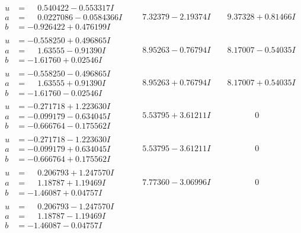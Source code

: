 \documentclass[1p]{elsarticle_modified}
\theoremstyle{definition}
\begin{document}
$$\begin{array}{c|c|c}
\begin{aligned}
u &= \phantom{-}0.540422 - 0.553317 I \\
a &= \phantom{-}0.0227086 - 0.0584366 I \\
b &= -0.926422 + 0.476199 I\end{aligned}
 & \phantom{-}7.32379 - 2.19374 I & \phantom{-}9.37328 + 0.81466 I \\ \hline\begin{aligned}
u &= -0.558250 + 0.496865 I \\
a &= \phantom{-}1.63555 - 0.91390 I \\
b &= -1.61760 + 0.02546 I\end{aligned}
 & \phantom{-}8.95263 - 0.76794 I & \phantom{-}8.17007 - 0.54035 I \\ \hline\begin{aligned}
u &= -0.558250 - 0.496865 I \\
a &= \phantom{-}1.63555 + 0.91390 I \\
b &= -1.61760 - 0.02546 I\end{aligned}
 & \phantom{-}8.95263 + 0.76794 I & \phantom{-}8.17007 + 0.54035 I \\ \hline\begin{aligned}
u &= -0.271718 + 1.223630 I \\
a &= -0.099179 - 0.634045 I \\
b &= -0.666764 - 0.175562 I\end{aligned}
 & \phantom{-}5.53795 + 3.61211 I & \phantom{-0.000000 } 0 \\ \hline\begin{aligned}
u &= -0.271718 - 1.223630 I \\
a &= -0.099179 + 0.634045 I \\
b &= -0.666764 + 0.175562 I\end{aligned}
 & \phantom{-}5.53795 - 3.61211 I & \phantom{-0.000000 } 0 \\ \hline\begin{aligned}
u &= \phantom{-}0.206793 + 1.247570 I \\
a &= \phantom{-}1.18787 + 1.19469 I \\
b &= -1.46087 + 0.04757 I\end{aligned}
 & \phantom{-}7.77360 - 3.06996 I & \phantom{-0.000000 } 0 \\ \hline\begin{aligned}
u &= \phantom{-}0.206793 - 1.247570 I \\
a &= \phantom{-}1.18787 - 1.19469 I \\
b &= -1.46087 - 0.04757 I\end{aligned}

\end{array}$$
\end{document}
